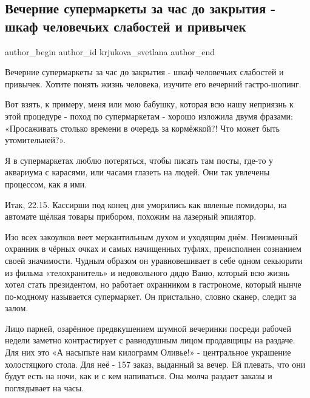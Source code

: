  
 
 
 
 
 
\subsection{Вечерние супермаркеты за час до закрытия - шкаф человечьих слабостей и привычек}
\label{sec:30_06_2021.fb.krjukova_svetlana.1.supermarket_chelovek}
\ifcmt
 author_begin
   author_id krjukova_svetlana
 author_end
\fi

Вечерние супермаркеты за час до закрытия - шкаф человечьих слабостей и
привычек. Хотите понять жизнь человека, изучите его вечерний гастро-шопинг. 

Вот взять, к примеру, меня или мою бабушку, которая всю нашу неприязнь к этой
процедуре - поход по супермаркетам - хорошо изложила двумя фразами:
«Просаживать столько времени в очередь за кормёжкой?! Что может быть
утомительней?». 

Я в супермаркетах люблю потеряться, чтобы писать там посты, где-то у аквариума
с карасями, или часами глазеть на людей. Они так увлечены процессом, как я ими.

Итак, 22.15. Кассирши под конец дня уморились как вяленые помидоры, на автомате
щёлкая товары прибором, похожим на лазерный эпилятор. 

Изо всех закоулков веет меркантильным духом и уходящим днём. Неизменный
охранник в чёрных очках и самых начищенных туфлях, преисполнен сознанием своей
значимости. Чудным образом он уравновешивает в себе одном секьюрити из фильма
«телохранитель» и недовольного дядю Ваню, который всю жизнь хотел стать
президентом, но работает охранником в гастрономе, который нынче по-модному
называется супермаркет. Он пристально, словно сканер, следит за залом. 

Лицо парней, озарённое предвкушением шумной вечеринки посреди рабочей недели
заметно контрастирует с равнодушным лицом продавщицы на раздаче. Для них это «А
насыпьте нам килограмм Оливье!» - центральное украшение холостяцкого стола. Для
неё - 157 заказ, выданный за вечер. Ей плевать, что они будут есть на ночи, как
и с кем напиваться. Она молча раздает заказы и поглядывает на часы. 


